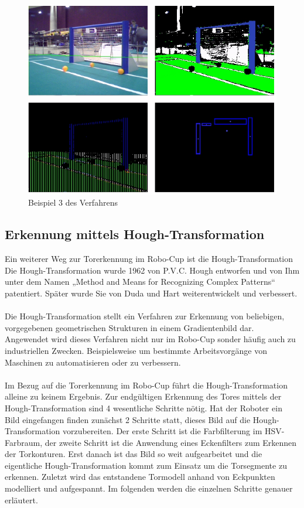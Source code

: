 \documentclass[a4paper,12pt]{article}
\begin{document}
\begin{figure}[H]
\includegraphics[scale=0.8]{example-detection4.png}
\caption{Beispiel 3 des Verfahrens}
\label{fig:example4}
\end{figure}

\subsection{Erkennung mittels Hough-Transformation}
Ein weiterer Weg zur Torerkennung im Robo-Cup ist die Hough-Transformation
Die Hough-Transformation wurde 1962 von P.V.C. Hough entworfen und von Ihm unter dem Namen „Method and Means for Recognizing Complex Patterns“ patentiert. Später wurde Sie von Duda und Hart weiterentwickelt und verbessert. \\
\\
Die Hough-Transformation stellt ein Verfahren zur Erkennung von beliebigen, vorgegebenen geometrischen Strukturen in einem Gradientenbild dar. Angewendet wird dieses Verfahren nicht nur im Robo-Cup sonder häufig auch zu industriellen Zwecken. Beispielsweise um bestimmte Arbeitsvorgänge von Maschinen zu automatisieren oder zu verbessern. \\
\\
Im Bezug auf die Torerkennung im Robo-Cup führt die Hough-Transformation alleine zu keinem Ergebnis. Zur endgültigen Erkennung des Tores mittels der Hough-Transformation sind 4 wesentliche Schritte nötig. Hat der Roboter ein Bild eingefangen finden zunächst 2 Schritte statt, dieses Bild auf die Hough-Transformation vorzubereiten. Der erste Schritt ist die Farbfilterung im HSV-Farbraum, der zweite Schritt ist die Anwendung eines Eckenfilters zum Erkennen der Torkonturen. Erst danach ist das Bild so weit aufgearbeitet und die eigentliche Hough-Transformation kommt zum Einsatz um die Torsegmente zu erkennen. Zuletzt wird das entstandene Tormodell anhand von Eckpunkten modelliert und aufgespannt. Im folgenden werden die einzelnen Schritte genauer erläutert.
\end{document}
